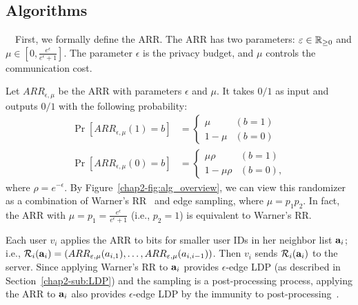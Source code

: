 \subsection{Algorithms}
\label{chap2-sub:three_algorithms}

\smallskip
{}~~First, we formally define the ARR.
The ARR has two parameters: $\varepsilon \in \mathbb{R}_{\ge0}$ and $\mu \in [0,\frac{e^{\epsilon}}{e^{\epsilon} + 1}]$.
The parameter $\epsilon$ is the privacy budget, and $\mu$ controls the communication cost.

Let
$ARR_{\epsilon,\mu}$ be the ARR with parameters $\epsilon$ and $\mu$. It takes $0/1$ as input and outputs $0/1$ with the following probability:
\begin{align}
    \Pr[ARR_{\epsilon,\mu}(1) = b] &= \begin{cases}\mu & (b=1) \\ 1-\mu & (b=0)\end{cases} \label{chap2-eq:ARR_1}\\
    \Pr[ARR_{\epsilon,\mu}(0) = b] &= \begin{cases}\mu\rho & (b=1) \\ 1-\mu \rho & (b=0), \end{cases} \label{chap2-eq:ARR_0}
\end{align}
where $\rho = e^{-\epsilon}$.
By Figure~\ref{chap2-fig:alg_overview},
we can view this randomizer as a combination of Warner's RR~\cite{Warner_JASA65}
and edge sampling, where $\mu=p_1 p_2$.
In fact, the ARR with $\mu = p_1 =\frac{e^{\epsilon}}{e^{\epsilon}+1}$ (i.e., $p_2=1$) is equivalent to Warner's RR.

Each user $v_i$ applies the ARR to bits for smaller user IDs in her neighbor list $\mathbf{a}_i$; i.e., $\mathcal{R}_i(\mathbf{a}_i) = (ARR_{\varepsilon,\mu}(a_{i,1}), \ldots, \allowbreak ARR_{\varepsilon,\mu}(a_{i,i-1}))$.
Then $v_i$ sends $\mathcal{R}_i(\mathbf{a}_i)$ to the server.
Since applying Warner's RR to $\mathbf{a}_i$ provides $\epsilon$-edge LDP (as described in Section~\ref{chap2-sub:LDP}) and the sampling is a post-processing process, applying the ARR to $\mathbf{a}_i$ also provides $\epsilon$-edge LDP by the immunity to post-processing~\cite{DP}.

